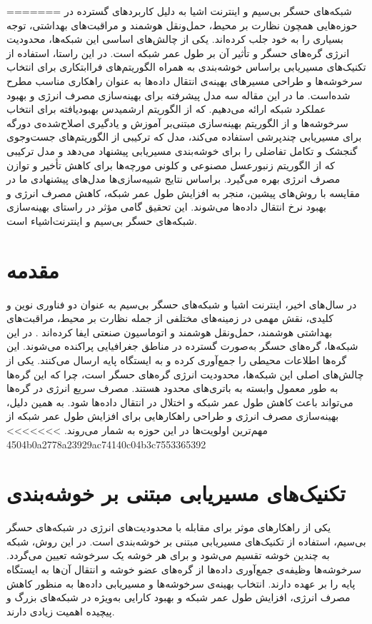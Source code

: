 \documentclass[11.5pt,onecolumn,a4paper]{article}
\begin{document}
=======
	شبکه‌های حسگر بی‌سیم و اینترنت‌ اشیا به دلیل کاربردهای گسترده در حوزه‌هایی همچون نظارت بر محیط، حمل‌ونقل هوشمند و مراقبت‌های بهداشتی، توجه بسیاری را به خود جلب کرده‌اند. یکی از چالش‌های اساسی این شبکه‌ها، محدودیت انرژی گره‌های حسگر و تأثیر آن بر طول عمر شبکه است. در این راستا، استفاده از تکنیک‌های مسیریابی براساس خوشه‌بندی به‌ همراه الگوریتم‌های فراابتکاری برای انتخاب سرخوشه‌ها و طراحی مسیرهای بهینه‌ی انتقال داده‌ها به عنوان راهکاری مناسب مطرح شده‌است. ما در این مقاله سه مدل پیشرفته برای بهینه‌سازی مصرف انرژی و بهبود عملکرد شبکه ارائه می‌دهیم.  که از الگوریتم ارشمیدس بهبودیافته برای انتخاب سرخوشه‌ها و از الگوریتم بهینه‌سازی مبتنی‌بر آموزش و یادگیری اصلاح‌شده‌ی دورگه برای مسیریابی چندپرشی استفاده می‌کند، مدل  که ترکیبی از الگوریتم‌های جست‌وجوی گنجشک و تکامل تفاضلی را برای خوشه‌بندی مسیریابی پیشنهاد می‌دهد و مدل ترکیبی  که از الگوریتم زنبورعسل مصنوعی و کلونی مورچه‌ها برای کاهش تأخیر و توازن مصرف انرژی بهره می‌گیرد. براساس نتایج شبیه‌سازی‌ها مدل‌های پیشنهادی ما در مقایسه با روش‌های پیشین، منجر به افزایش طول عمر شبکه، کاهش مصرف انرژی و بهبود نرخ انتقال داده‌ها می‌شوند. این تحقیق گامی مؤثر در راستای بهینه‌سازی شبکه‌های حسگر بی‌سیم و اینترنت‌اشیاء است.
	\clearpage
	\newpage
	\section*{مقدمه}
	\hspace*{1em}در سال‌های اخیر، اینترنت اشیا  و شبکه‌های حسگر بی‌سیم به عنوان دو فناوری نوین و کلیدی، نقش مهمی در زمینه‌های مختلفی از جمله نظارت بر محیط، مراقبت‌های بهداشتی هوشمند، حمل‌ونقل هوشمند و اتوماسیون صنعتی ایفا کرده‌اند \cite{ref1, ref2, ref3}. در این شبکه‌ها، گره‌های حسگر به‌صورت گسترده در مناطق جغرافیایی پراکنده می‌شوند. این گره‌ها اطلاعات محیطی را جمع‌آوری کرده و به ایستگاه‌ پایه ارسال می‌کنند. یکی از چالش‌های اصلی این شبکه‌ها، محدودیت انرژی گره‌های حسگر است، چرا که این گره‌ها به طور معمول وابسته به باتری‌های محدود هستند. مصرف سریع انرژی در گره‌ها می‌تواند باعث کاهش طول عمر شبکه و اختلال در انتقال داده‌ها شود. به همین دلیل، بهینه‌سازی مصرف انرژی و طراحی راهکارهایی برای افزایش طول عمر شبکه از مهم‌ترین اولویت‌ها در این حوزه به‌ شمار می‌روند.
>>>>>>> 4504b0a2778a23929ac74140c04b3c7553365392
	
	\section*{تکنیک‌های مسیریابی مبتنی بر خوشه‌بندی}
	\hspace*{1em}یکی از راهکارهای موثر برای مقابله با محدودیت‌های انرژی در شبکه‌های حسگر بی‌سیم، استفاده از تکنیک‌های مسیریابی مبتنی بر خوشه‌بندی است. در این روش، شبکه به چندین خوشه تقسیم می‌شود و برای هر خوشه یک سرخوشه تعیین می‌گردد. سرخوشه‌ها وظیفه‌ی جمع‌آوری داده‌ها از گره‌های عضو خوشه و انتقال آن‌ها به ایستگاه پایه را بر عهده دارند. انتخاب بهینه‌ی سرخوشه‌ها و مسیریابی داده‌ها به منظور کاهش مصرف انرژی، افزایش طول عمر شبکه و بهبود کارایی به‌ویژه در شبکه‌های بزرگ و پیچیده اهمیت زیادی دارند.
	
\end{document}
